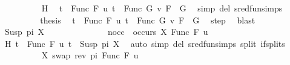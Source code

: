 \begin{isabellebody}
\ \ \ \ \ \ \ \ \isamarkupfalse%
\ H\ \isamarkupfalse%
\ {\isacartoucheopen}t{}\ {\isacharequal}{\kern0pt}\ Func\ F\ u{\isacartoucheclose}\ {\isacartoucheopen}t{}\ {\isacharequal}{\kern0pt}\ Func\ G\ v{\isacartoucheclose}\ {\isacartoucheopen}F\ {\isacharequal}{\kern0pt}\ G{\isacartoucheclose}\ \isamarkupfalse%
\ {\isacharparenleft}{\kern0pt}simp\ del{\isacharcolon}{\kern0pt}\ sred{\isacharunderscore}{\kern0pt}fun{\isachardot}{\kern0pt}simps{\isacharparenright}{\kern0pt}\isanewline
\ \ \ \ \ \ \isamarkupfalse%
\ \isamarkupfalse%
\ {\isacharquery}{\kern0pt}thesis\ \isamarkupfalse%
\ {\isacartoucheopen}t{}\ {\isacharequal}{\kern0pt}\ Func\ F\ u{\isacartoucheclose}\ {\isacartoucheopen}t{}\ {\isacharequal}{\kern0pt}\ Func\ G\ v{\isacartoucheclose}\ {\isacartoucheopen}F\ {\isacharequal}{\kern0pt}\ G{\isacartoucheclose}\ \isamarkupfalse%
\ step\ \isamarkupfalse%
\ blast\isanewline
\ \ \ \ \isamarkupfalse%
\isanewline
\ \ \ \ \ \ \isamarkupfalse%
\ {\isacharparenleft}{\kern0pt}Susp\ pi\ X{\isacharparenright}{\kern0pt}\isanewline
\ \ \ \ \ \ %
\isanewline
\ \ \ \ \ \ \isamarkupfalse%
\ nocc{\isacharcolon}{\kern0pt}\ {\isachardoublequoteopen}{\isasymnot}\ occurs\ X\ {\isacharparenleft}{\kern0pt}Func\ F\ u{\isacharparenright}{\kern0pt}{\isachardoublequoteclose}\isanewline
\ \ \ \ \ \ \ \ \isamarkupfalse%
\ H\ {\isacartoucheopen}t{}\ {\isacharequal}{\kern0pt}\ Func\ F\ u{\isacartoucheclose}\ {\isacartoucheopen}t{}\ {\isacharequal}{\kern0pt}\ Susp\ pi\ X{\isacartoucheclose}\ \isamarkupfalse%
\ {\isacharparenleft}{\kern0pt}auto\ simp\ del{\isacharcolon}{\kern0pt}\ sred{\isacharunderscore}{\kern0pt}fun{\isachardot}{\kern0pt}simps\ split{\isacharcolon}{\kern0pt}\ if{\isacharunderscore}{\kern0pt}splits{\isacharparenright}{\kern0pt}\isanewline
\ \ \ \ \ \ \isamarkupfalse%
\ {\isacharquery}{\kern0pt}{\isasymsigma}\ {\isacharequal}{\kern0pt}\ {\isachardoublequoteopen}{\isacharbrackleft}{\kern0pt}{\isacharparenleft}{\kern0pt}X{\isacharcomma}{\kern0pt}\ swap\ {\isacharparenleft}{\kern0pt}rev\ pi{\isacharparenright}{\kern0pt}\ {\isacharparenleft}{\kern0pt}Func\ F\ u{\isacharparenright}{\kern0pt}{\isacharparenright}{\kern0pt}{\isacharbrackright}{\kern0pt}{\isachardoublequoteclose}\isanewline

\end{isabellebody}
